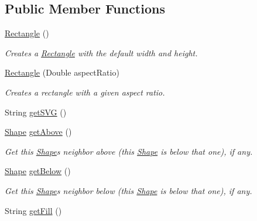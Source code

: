 \subsection*{Public Member Functions}
\begin{DoxyCompactItemize}
\item 
\hyperlink{classcom_1_1aarrelaakso_1_1drawl_1_1_rectangle_aa595469acf7ff55a123ba946633c573f}{Rectangle} ()
\begin{DoxyCompactList}\small\item\em Creates a \hyperlink{classcom_1_1aarrelaakso_1_1drawl_1_1_rectangle}{Rectangle} with the default width and height. \end{DoxyCompactList}\item 
\hyperlink{classcom_1_1aarrelaakso_1_1drawl_1_1_rectangle_ab0fbbbcfd8392e59ffdb4cb78f3447ff}{Rectangle} (Double aspect\+Ratio)
\begin{DoxyCompactList}\small\item\em Creates a rectangle with a given aspect ratio. \end{DoxyCompactList}\item 
String \hyperlink{classcom_1_1aarrelaakso_1_1drawl_1_1_rectangle_a175f326e054b08426648a81a246904a7}{get\+S\+VG} ()
\item 
\hyperlink{classcom_1_1aarrelaakso_1_1drawl_1_1_shape}{Shape} \hyperlink{classcom_1_1aarrelaakso_1_1drawl_1_1_shape_acebea2aa57031322323c9bf50ee447db}{get\+Above} ()
\begin{DoxyCompactList}\small\item\em Get this \hyperlink{classcom_1_1aarrelaakso_1_1drawl_1_1_shape}{Shape}\textquotesingle{}s neighbor above (this \hyperlink{classcom_1_1aarrelaakso_1_1drawl_1_1_shape}{Shape} is below that one), if any. \end{DoxyCompactList}\item 
\hyperlink{classcom_1_1aarrelaakso_1_1drawl_1_1_shape}{Shape} \hyperlink{classcom_1_1aarrelaakso_1_1drawl_1_1_shape_a53de5ab609d879719cd3b372dfe8df58}{get\+Below} ()
\begin{DoxyCompactList}\small\item\em Get this \hyperlink{classcom_1_1aarrelaakso_1_1drawl_1_1_shape}{Shape}\textquotesingle{}s neighbor below (this \hyperlink{classcom_1_1aarrelaakso_1_1drawl_1_1_shape}{Shape} is below that one), if any. \end{DoxyCompactList}\item 
String \hyperlink{classcom_1_1aarrelaakso_1_1drawl_1_1_shape_a0d9a33a3e151aaceeec140bea343a650}{get\+Fill} ()

\end{DoxyCompactItemize}
